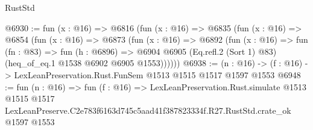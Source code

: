 \begin{lexlean}{RustStd}
\begin{coremodule}
@6930 := fun (x : @16) =>
  @6816
    (fun (x : @16) =>
    @6835
      (fun (x : @16) =>
      @6854
        (fun (x : @16) =>
        @6873
          (fun (x : @16) =>
          @6892
            (fun (x : @16) =>
            fun (fn : @83) =>
            fun (h : @6896) =>
            @6904 @6905 (Eq.refl.{2} (Sort 1) @83) (heq_of_eq.{1} @1538 @6902 @6905 @1553))))))
@6938 := (n : @16) -> (f : @16) -> LexLeanPreservation.Rust.FunSem @1513 @1515 @1517 @1597 @1553
@6948 := fun (n : @16) =>
  fun (f : @16) =>
  LexLeanPreservation.Rust.simulate
    @1513
    @1515
    @1517
    LexLeanPreserve.C2e783f6163d745c5aad41f387823334f.R27.RustStd.crate_ok
    @1597
    @1553
\end{coremodule}
\end{lexlean}
